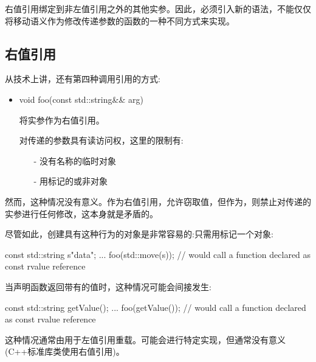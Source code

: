 右值引用绑定到非左值引用之外的其他实参。因此，必须引入新的语法，不能仅仅将移动语义作为修改传递参数的函数的一种不同方式来实现。

\subsection{右值引用}

从技术上讲，还有第四种调用引用的方式:

\begin{itemize}
	\item \begin{cppcode}
void foo(const std::string\&\& arg)
\end{cppcode}
	将实参作为右值引用。

	对传递的参数具有读访问权，这里的限制有:
	\begin{itemize}
		\item[-] 没有名称的临时对象
		\item[-] 用标记的或非对象
	\end{itemize}
\end{itemize}

然而，这种情况没有意义。作为右值引用，允许窃取值，但作为，则禁止对传递的实参进行任何修改，这本身就是矛盾的。

尽管如此，创建具有这种行为的对象是非常容易的:只需用标记一个对象:

\begin{cppcode}
const std::string s{"data"};
...
foo(std::move(s)); // would call a function declared as const rvalue reference
\end{cppcode}

当声明函数返回带有的值时，这种情况可能会间接发生:

\begin{cppcode}
const std::string getValue();
...
foo(getValue()); // would call a function declared as const rvalue reference
\end{cppcode}

这种情况通常由用于左值引用重载。可能会进行特定实现，但通常没有意义(C++标准库类使用右值引用)。




















































